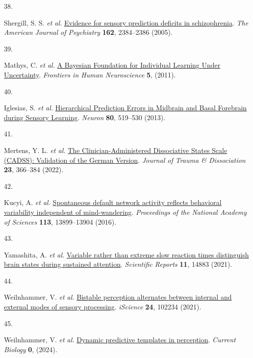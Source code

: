 \documentclass[
]{article}
\newlength{\cslhangindent}
\newlength{\csllabelwidth}
\newenvironment{CSLReferences}[2] %
 {\begin{list}{}{%
  \setlength{\itemindent}{0pt}
  \setlength{\leftmargin}{0pt}
  \setlength{\parsep}{0pt}
  \ifodd #1
   \setlength{\leftmargin}{\cslhangindent}
   \setlength{\itemindent}{-1\cslhangindent}
  \fi
  \setlength{\itemsep}{#2\baselineskip}}}
 {\end{list}}
\newcommand{\CSLLeftMargin}[1]{\parbox[t]{\csllabelwidth}{\strut#1\strut}}
\newcommand{\CSLRightInline}[1]{\parbox[t]{\linewidth - \csllabelwidth}{\strut#1\strut}}
\begin{document}
\begin{CSLReferences}{0}{0}
\CSLLeftMargin{38. }%
\CSLRightInline{Shergill, S. S. \emph{et al.}
\href{https://doi.org/10.1176/appi.ajp.162.12.2384}{Evidence for sensory
prediction deficits in schizophrenia}. \emph{The American Journal of
Psychiatry} \textbf{162}, 2384--2386 (2005).}

\CSLLeftMargin{39. }%
\CSLRightInline{Mathys, C. \emph{et al.}
\href{https://doi.org/10.3389/fnhum.2011.00039}{A {Bayesian}
{Foundation} for {Individual} {Learning} {Under} {Uncertainty}}.
\emph{Frontiers in Human Neuroscience} \textbf{5}, (2011).}

\CSLLeftMargin{40. }%
\CSLRightInline{Iglesias, S. \emph{et al.}
\href{https://doi.org/10.1016/j.neuron.2013.09.009}{Hierarchical
{Prediction} {Errors} in {Midbrain} and {Basal} {Forebrain} during
{Sensory} {Learning}}. \emph{Neuron} \textbf{80}, 519--530 (2013).}

\CSLLeftMargin{41. }%
\CSLRightInline{Mertens, Y. L. \emph{et al.}
\href{https://doi.org/10.1080/15299732.2021.1989111}{The
{Clinician}-{Administered} {Dissociative} {States} {Scale} ({CADSS}):
{Validation} of the {German} {Version}}. \emph{Journal of Trauma \&
Dissociation} \textbf{23}, 366--384 (2022).}

\CSLLeftMargin{42. }%
\CSLRightInline{Kucyi, A. \emph{et al.}
\href{https://doi.org/10.1073/pnas.1611743113}{Spontaneous default
network activity reflects behavioral variability independent of
mind-wandering}. \emph{Proceedings of the National Academy of Sciences}
\textbf{113}, 13899--13904 (2016).}

\CSLLeftMargin{43. }%
\CSLRightInline{Yamashita, A. \emph{et al.}
\href{https://doi.org/10.1038/s41598-021-94161-0}{Variable rather than
extreme slow reaction times distinguish brain states during sustained
attention}. \emph{Scientific Reports} \textbf{11}, 14883 (2021).}

\CSLLeftMargin{44. }%
\CSLRightInline{Weilnhammer, V. \emph{et al.}
\href{https://doi.org/10.1016/j.isci.2021.102234}{Bistable perception
alternates between internal and external modes of sensory processing}.
\emph{iScience} \textbf{24}, 102234 (2021).}

\CSLLeftMargin{45. }%
\CSLRightInline{Weilnhammer, V. \emph{et al.}
\href{https://doi.org/10.1016/j.cub.2024.07.087}{Dynamic predictive
templates in perception}. \emph{Current Biology} \textbf{0}, (2024).}


\end{CSLReferences}
\end{document}
